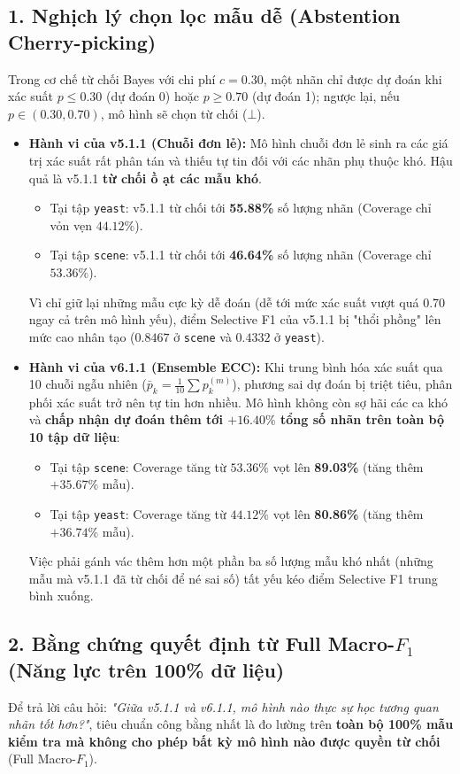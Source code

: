 \documentclass[11pt,a4paper]{article}
\begin{document}
\subsection{1. Nghịch lý chọn lọc mẫu dễ (Abstention Cherry-picking)}
Trong cơ chế từ chối Bayes với chi phí $c = 0.30$, một nhãn chỉ được dự đoán khi xác suất $p \le 0.30$ (dự đoán 0) hoặc $p \ge 0.70$ (dự đoán 1); ngược lại, nếu $p \in (0.30, 0.70)$, mô hình sẽ chọn từ chối ($\bot$).

\begin{itemize}
    \item \textbf{Hành vi của v5.1.1 (Chuỗi đơn lẻ):} Mô hình chuỗi đơn lẻ sinh ra các giá trị xác suất rất phân tán và thiếu tự tin đối với các nhãn phụ thuộc khó. Hậu quả là v5.1.1 \textbf{từ chối ồ ạt các mẫu khó}.
    \begin{itemize}
        \item Tại tập \texttt{yeast}: v5.1.1 từ chối tới \textbf{55.88\%} số lượng nhãn (Coverage chỉ vỏn vẹn $44.12\%$).
        \item Tại tập \texttt{scene}: v5.1.1 từ chối tới \textbf{46.64\%} số lượng nhãn (Coverage chỉ $53.36\%$).
    \end{itemize}
    Vì chỉ giữ lại những mẫu cực kỳ dễ đoán (dễ tới mức xác suất vượt quá 0.70 ngay cả trên mô hình yếu), điểm Selective F1 của v5.1.1 bị "thổi phồng" lên mức cao nhân tạo ($0.8467$ ở \texttt{scene} và $0.4332$ ở \texttt{yeast}).
    
    \item \textbf{Hành vi của v6.1.1 (Ensemble ECC):} Khi trung bình hóa xác suất qua 10 chuỗi ngẫu nhiên ($\bar{p}_k = \frac{1}{10}\sum p_k^{(m)}$), phương sai dự đoán bị triệt tiêu, phân phối xác suất trở nên tự tin hơn nhiều. Mô hình không còn sợ hãi các ca khó và \textbf{chấp nhận dự đoán thêm tới $+16.40\%$ tổng số nhãn trên toàn bộ 10 tập dữ liệu}:
    \begin{itemize}
        \item Tại tập \texttt{scene}: Coverage tăng từ $53.36\%$ vọt lên \textbf{89.03\%} (tăng thêm $+35.67\%$ mẫu).
        \item Tại tập \texttt{yeast}: Coverage tăng từ $44.12\%$ vọt lên \textbf{80.86\%} (tăng thêm $+36.74\%$ mẫu).
    \end{itemize}
    Việc phải gánh vác thêm hơn một phần ba số lượng mẫu khó nhất (những mẫu mà v5.1.1 đã từ chối để né sai số) tất yếu kéo điểm Selective F1 trung bình xuống.
\end{itemize}

\subsection{2. Bằng chứng quyết định từ Full Macro-\texorpdfstring{$F_1$}{F1} (Năng lực trên 100\% dữ liệu)}
Để trả lời câu hỏi: \textit{"Giữa v5.1.1 và v6.1.1, mô hình nào thực sự học tương quan nhãn tốt hơn?"}, tiêu chuẩn công bằng nhất là đo lường trên \textbf{toàn bộ 100\% mẫu kiểm tra mà không cho phép bất kỳ mô hình nào được quyền từ chối} (Full Macro-$F_1$).
\end{document}
